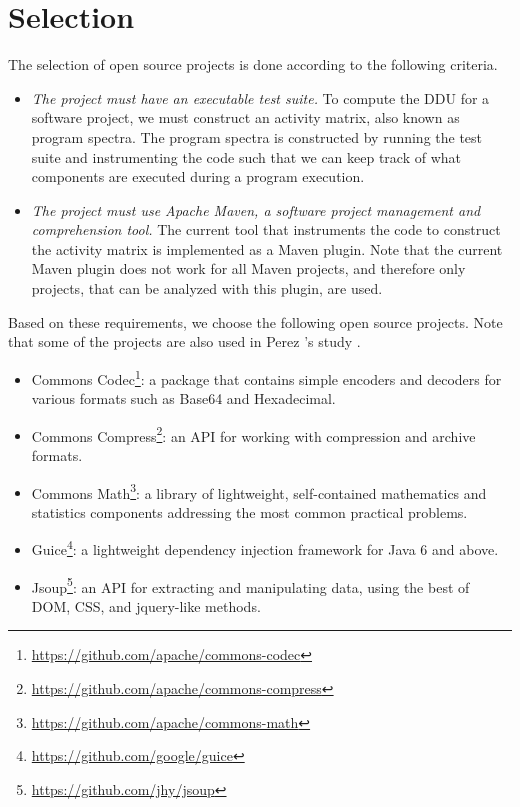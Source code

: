 \documentclass[twoside,a4paper,11pt]{memoir}
\begin{document}
\section{Selection}
The selection of open source projects is done according to the following criteria.
\begin{itemize}
  \item \emph{The project must have an executable test suite.}
  To compute the DDU for a software project, we must construct an activity matrix, also known as program spectra.
  The program spectra is constructed by running the test suite and instrumenting the code such that we can keep track of what components are executed during a program execution.

  \item \emph{The project must use Apache Maven, a software project management and comprehension tool.}
  The current tool that instruments the code to construct the activity matrix is implemented as a Maven plugin.
  Note that the current Maven plugin does not work for all Maven projects, and therefore only projects, that can be analyzed with this plugin, are used.
\end{itemize}

Based on these requirements, we choose the following open source projects.
Note that some of the projects are also used in Perez \etal's study \cite{DBLP:conf/icse/PerezAD17}.

\begin{itemize}[noitemsep]
    \item Commons Codec\footnote{\url{https://github.com/apache/commons-codec}}: a package that contains simple encoders and decoders for various formats such as Base64 and Hexadecimal.
    \item Commons Compress\footnote{\url{https://github.com/apache/commons-compress}}: an API for working with compression and archive formats.
    \item Commons Math\footnote{\url{https://github.com/apache/commons-math}}: a library of lightweight, self-contained mathematics and statistics components addressing the most common practical problems.
    \item Guice\footnote{\url{https://github.com/google/guice}}: a lightweight dependency injection framework for Java 6 and above.
    \item Jsoup\footnote{\url{https://github.com/jhy/jsoup}}: an API for extracting and manipulating data, using the best of DOM, CSS, and jquery-like methods.
\end{itemize}
\end{document}
